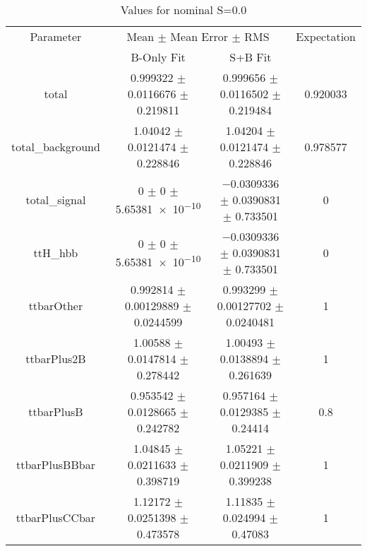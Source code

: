 \begin{table}
\centering
\caption{Values for nominal S=0.0}
\begin{tabular}{cccc}
\toprule
Parameter & \multicolumn{2}{c}{Mean $\pm$ Mean Error $\pm$ RMS} & Expectation\\
 & B-Only Fit & S+B Fit & \\
\midrule
total & \num{0.999322} $\pm$ \num{0.0116676} $\pm$ \num{0.219811} & \num{0.999656} $\pm$ \num{0.0116502} $\pm$ \num{0.219484} & \num{0.920033}\\
total\_background & \num{1.04042} $\pm$ \num{0.0121474} $\pm$ \num{0.228846} & \num{1.04204} $\pm$ \num{0.0121474} $\pm$ \num{0.228846} & \num{0.978577}\\
total\_signal & \num{0} $\pm$ \num{0} $\pm$ \num{5.65381e-10} & \num{-0.0309336} $\pm$ \num{0.0390831} $\pm$ \num{0.733501} & \num{0}\\
ttH\_hbb & \num{0} $\pm$ \num{0} $\pm$ \num{5.65381e-10} & \num{-0.0309336} $\pm$ \num{0.0390831} $\pm$ \num{0.733501} & \num{0}\\
ttbarOther & \num{0.992814} $\pm$ \num{0.00129889} $\pm$ \num{0.0244599} & \num{0.993299} $\pm$ \num{0.00127702} $\pm$ \num{0.0240481} & \num{1}\\
ttbarPlus2B & \num{1.00588} $\pm$ \num{0.0147814} $\pm$ \num{0.278442} & \num{1.00493} $\pm$ \num{0.0138894} $\pm$ \num{0.261639} & \num{1}\\
ttbarPlusB & \num{0.953542} $\pm$ \num{0.0128665} $\pm$ \num{0.242782} & \num{0.957164} $\pm$ \num{0.0129385} $\pm$ \num{0.24414} & \num{0.8}\\
ttbarPlusBBbar & \num{1.04845} $\pm$ \num{0.0211633} $\pm$ \num{0.398719} & \num{1.05221} $\pm$ \num{0.0211909} $\pm$ \num{0.399238} & \num{1}\\
ttbarPlusCCbar & \num{1.12172} $\pm$ \num{0.0251398} $\pm$ \num{0.473578} & \num{1.11835} $\pm$ \num{0.024994} $\pm$ \num{0.47083} & \num{1}\\
\bottomrule
\end{tabular}
\end{table}